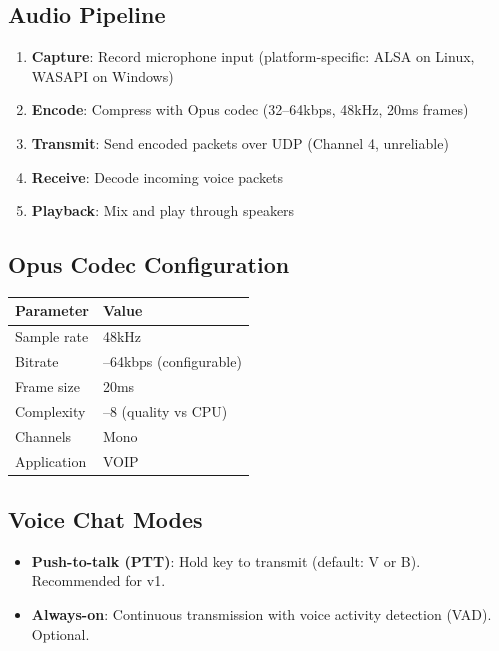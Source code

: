 \documentclass[11pt]{article}
\begin{document}
\subsection{Audio Pipeline}

\begin{enumerate}
  \item \textbf{Capture}: Record microphone input (platform-specific: ALSA on Linux, WASAPI on Windows)
  \item \textbf{Encode}: Compress with Opus codec (32--64kbps, 48kHz, 20ms frames)
  \item \textbf{Transmit}: Send encoded packets over UDP (Channel 4, unreliable)
  \item \textbf{Receive}: Decode incoming voice packets
  \item \textbf{Playback}: Mix and play through speakers
\end{enumerate}

\subsection{Opus Codec Configuration}

\begin{longtable}{|>{\raggedright\arraybackslash}p{}|>{\raggedright\arraybackslash}p{}|}
\hline
\textbf{Parameter} & \textbf{Value} \\
\hline
Sample rate & 48kHz \\
\hline
Bitrate & 32--64kbps (configurable) \\
\hline
Frame size & 20ms \\
\hline
Complexity & 5--8 (quality vs CPU) \\
\hline
Channels & Mono \\
\hline
Application & VOIP \\
\hline
\end{longtable}

\subsection{Voice Chat Modes}

\begin{itemize}
  \item \textbf{Push-to-talk (PTT)}: Hold key to transmit (default: V or B). Recommended for v1.
  \item \textbf{Always-on}: Continuous transmission with voice activity detection (VAD). Optional.
\end{itemize}
\end{document}
